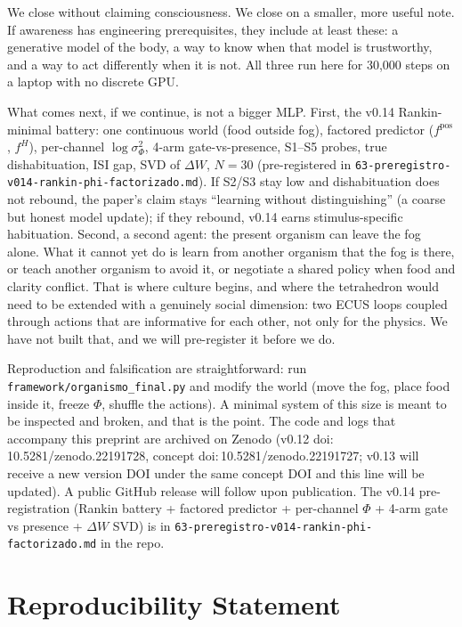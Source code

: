\documentclass[11pt,a4paper]{article}
\begin{document}
We close without claiming consciousness. We close on a smaller, more useful note. If awareness has engineering prerequisites, they include at least these: a generative model of the body, a way to know when that model is trustworthy, and a way to act differently when it is not. All three run here for 30,000 steps on a laptop with no discrete GPU.

What comes next, if we continue, is not a bigger MLP. First, the v0.14 Rankin-minimal battery: one continuous world (food outside fog), factored predictor ($f^{\mathrm{pos}}$, $f^{H}$), per-channel $\log \sigma^2_{\Phi}$, 4-arm gate-vs-presence, S1--S5 probes, true dishabituation, ISI gap, SVD of $\Delta W$, $N=30$ (pre-registered in \texttt{63-preregistro-v014-rankin-phi-factorizado.md}). If S2/S3 stay low and dishabituation does not rebound, the paper's claim stays ``learning without distinguishing'' (a coarse but honest model update); if they rebound, v0.14 earns stimulus-specific habituation. Second, a second agent: the present organism can leave the fog alone. What it cannot yet do is learn from another organism that the fog is there, or teach another organism to avoid it, or negotiate a shared policy when food and clarity conflict. That is where culture begins, and where the tetrahedron would need to be extended with a genuinely social dimension: two ECUS loops coupled through actions that are informative for each other, not only for the physics. We have not built that, and we will pre-register it before we do.

Reproduction and falsification are straightforward: run \texttt{framework/organismo\_final.py} and modify the world (move the fog, place food inside it, freeze $\Phi$, shuffle the actions). A minimal system of this size is meant to be inspected and broken, and that is the point. The code and logs that accompany this preprint are archived on Zenodo (v0.12 doi:\,10.5281/zenodo.22191728, concept doi:\,10.5281/zenodo.22191727; v0.13 will receive a new version DOI under the same concept DOI and this line will be updated). A public GitHub release will follow upon publication. The v0.14 pre-registration (Rankin battery + factored predictor + per-channel $\Phi$ + 4-arm gate vs presence + $\Delta W$ SVD) is in \texttt{63-preregistro-v014-rankin-phi-factorizado.md} in the repo.

\section{Reproducibility Statement}
\end{document}
